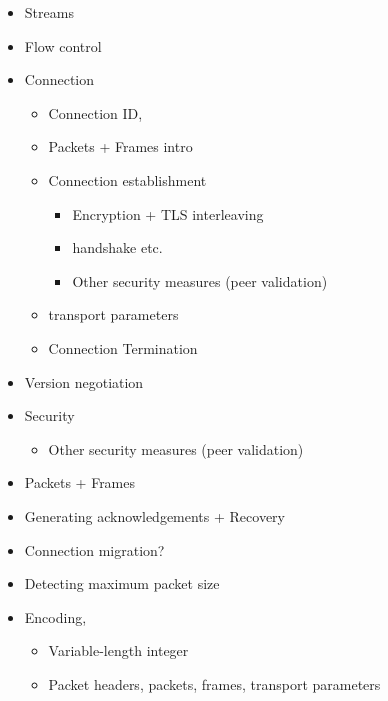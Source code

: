 \begin{itemize}

  \item Streams
  \item Flow control

  \item Connection
    \begin{itemize}
      \item Connection ID,
      \item Packets + Frames intro
      \item Connection establishment
        \begin{itemize}
          \item Encryption + TLS interleaving
          \item  handshake etc.
          \item Other security measures (peer validation)
        \end{itemize}
      \item transport parameters
      \item Connection Termination
    \end{itemize}
  \item Version negotiation
  \item Security
    \begin{itemize}
      \item Other security measures (peer validation)
    \end{itemize}
  \item Packets + Frames
  \item Generating acknowledgements + Recovery

  \item Connection migration?

  \item Detecting maximum packet size
  \item Encoding,
    \begin{itemize}
      \item Variable-length integer
      \item Packet headers, packets, frames, transport parameters
    \end{itemize}

\end{itemize}
